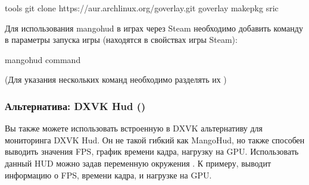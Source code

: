 \documentclass[letterpaper,10pt,russian,openany]{sphinxmanual}
\begin{document}
\begin{sphinxVerbatim}[commandchars=\\\{\}]
 tools                                         
git clone https://aur.archlinux.org/goverlay.git 
 goverlay                                      
makepkg \PYGZhy{}sric                                    
\end{sphinxVerbatim}

\sphinxAtStartPar
Для использования mangohud в играх через Steam необходимо добавить команду в параметры запуска игры (находятся в свойствах игры Steam):

\begin{sphinxVerbatim}[commandchars=\\\{\}]
mangohud \PYGZpc{}command\PYGZpc{}
\end{sphinxVerbatim}

\sphinxAtStartPar
(Для указания нескольких команд необходимо разделять их )

\sphinxAtStartPar
{}

\sphinxAtStartPar
{}

\ignorespaces 

\subsubsection{Альтернатива: DXVK Hud ()}
\label{\detokenize{source/linux-gaming:dxvk-hud-wine-proton}}\label{\detokenize{source/linux-gaming:dxvk-hud}}\label{\detokenize{source/linux-gaming:index-20}}
\sphinxAtStartPar
Вы также можете использовать встроенную в DXVK альтернативу для мониторинга \sphinxhyphen{} DXVK Hud.
Он не такой гибкий как MangoHud, но также способен выводить значения FPS, график времени кадра, нагрузку на GPU.
Использовать данный HUD можно задав переменную окружения .
К примеру,  выводит информацию о FPS, времени кадра, и нагрузке на GPU.
\end{document}
